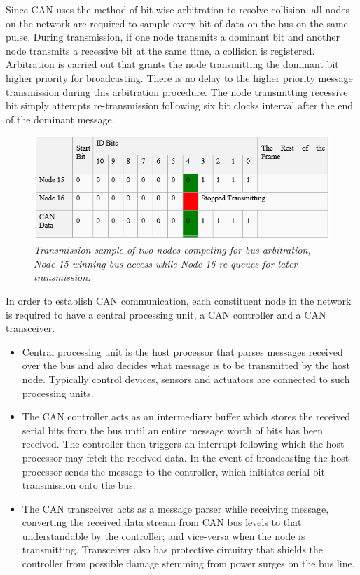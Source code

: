 \documentclass{article}
\begin{document}
\noindent Since CAN uses the method of bit-wise arbitration to resolve collision, all nodes on the network are required to sample every bit of data on the bus on the same pulse. During transmission, if one node transmits a dominant bit and another node transmits a recessive bit at the same time, a collision is registered. Arbitration is carried out that grants the node transmitting the dominant bit higher priority for broadcasting. There is no delay to the higher priority message transmission during this arbitration procedure. The node transmitting recessive bit simply attempts re-transmission following six bit clocks interval after the end of the dominant message. \\

\begin{figure}[!ht]
\centering 
\includegraphics[width=12cm]{fig_3.PNG}
\caption{\small \sl Transmission sample of two nodes competing for bus arbitration, Node 15 winning bus access while Node 16 re-queues
for later transmission.}  
\end{figure}

\noindent In order to establish CAN communication, each constituent node in the network is required to have a central processing unit, a CAN controller and a CAN transceiver.

\begin{itemize}
\item Central processing unit is the host processor that parses messages received over the bus and also decides what message is to be transmitted by the host node. Typically control devices, sensors and actuators are connected to such processing units.
\item The CAN controller acts as an intermediary buffer which stores the received serial bits from the bus until an entire message worth of bits has been received. The controller then triggers an interrupt following which the host processor may fetch the received data. In the event of broadcasting the host processor sends the message to the controller, which initiates serial bit transmission onto the bus.
\item The CAN transceiver acts as a message parser while receiving message, converting the received data stream from CAN bus levels to that understandable by the controller; and vice-versa when the node is transmitting. Transceiver also has protective circuitry that shields the controller from possible damage stemming from power surges on the bus line.
\end{itemize}
\end{document}

